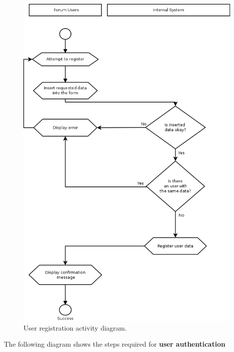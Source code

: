 \documentclass[12pt]{report}
\renewcommand\emph{\textbf}
\begin{document}
                    \begin{figure}[H]
                    \caption{User registration activity diagram.}
                    \centering
                    \includegraphics[width=1\textwidth]{di/1}
                    \end{figure}

                    \newpage

                    The following diagram shows the steps required for \emph{user authentication}
\end{document}
